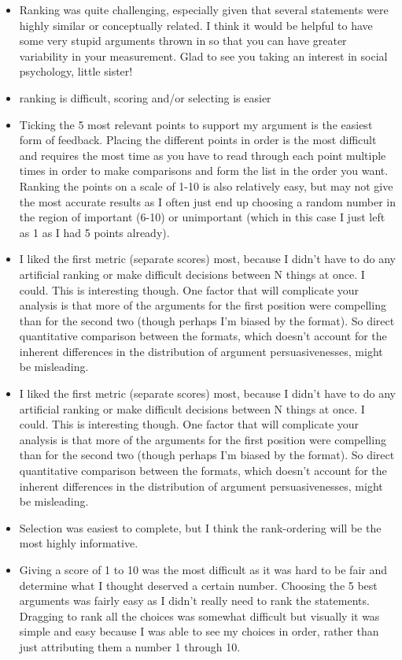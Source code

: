 \documentclass[10pt]{article}
\begin{document}
\begin{itemize}
\item Ranking was quite challenging, especially given that several statements were highly similar or conceptually related. I think it would be helpful to have some very stupid arguments thrown in so that you can have greater variability in your measurement. Glad to see you taking an interest in social psychology, little sister!
\item ranking is difficult, scoring and/or selecting is easier
\item Ticking the 5 most relevant points to support my argument is the easiest form of feedback. Placing the different points in order is the most difficult and requires the most time as you have to read through each point multiple times in order to make comparisons and form the list in the order you want. Ranking the points on a scale of 1-10 is also relatively easy, but may not give the most accurate results as I often just end up choosing a random number in the region of important (6-10) or unimportant (which in this case I just left as 1 as I had 5 points already).
\item I liked the first metric (separate scores) most, because I didn't have to do any artificial ranking or make difficult decisions between N things at once. I could. This is interesting though. One factor that will complicate your analysis is that more of the arguments for the first position were compelling than for the second two (though perhaps I'm biased by the format). So direct quantitative comparison between the formats, which doesn't account for the inherent differences in the distribution of argument persuasivenesses, might be misleading.
\item I liked the first metric (separate scores) most, because I didn't have to do any artificial ranking or make difficult decisions between N things at once. I could. This is interesting though. One factor that will complicate your analysis is that more of the arguments for the first position were compelling than for the second two (though perhaps I'm biased by the format). So direct quantitative comparison between the formats, which doesn't account for the inherent differences in the distribution of argument persuasivenesses, might be misleading.
\item Selection was easiest to complete, but I think the rank-ordering will be the most highly informative.
\item Giving a score of 1 to 10 was the most difficult as it was hard to be fair and determine what I thought deserved a certain number. Choosing the 5 best arguments was fairly easy as I didn't really need to rank the statements. Dragging to rank all the choices was somewhat difficult but visually it was simple and easy because I was able to see my choices in order, rather than just attributing them a number 1 through 10.

\end{itemize}
\end{document}
